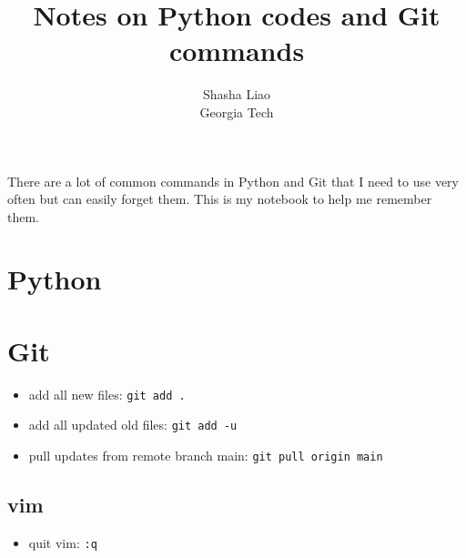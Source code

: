 \documentclass[twoside,12pt]{article}
\begin{document}
\title{Notes on Python codes and Git commands}
\author {Shasha Liao \\ Georgia Tech}
\maketitle
There are a lot of common commands in Python and Git that I need to use very often but can easily forget them. This is my notebook to help me remember them. 
\section{Python}

\section{Git}
\begin{itemize}
\item add all new files: \texttt{git add .}
\item add all updated old files: \texttt{git add -u}
\item pull updates from remote branch main: \texttt{git pull origin main}
\end{itemize}
\subsection{vim}
\begin{itemize}
\item quit vim: \texttt{:q}
\end{itemize}
\end{document}
